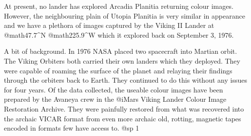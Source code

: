 
At present, no lander has explored Arcadia Planitia returning colour images. However, the neighbouring plain of Utopia Planitia is very similar in appearance and we have a plethora of images captured by the Viking II Lander at @math{47.7^{\circ}}N @math{225.9^{\circ}}W which it explored back on September 3, 1976.

A bit of background. In 1976 NASA placed two spacecraft into Martian orbit. The Viking Orbiters both carried their own landers which they deployed. They were capable of roaming the surface of the planet and relaying their findings through the orbiters back to Earth. They continued to do this without any issues for four years. Of the data collected, the useable colour images have been prepared by the Avaneya crew in the @i{Mars Viking Lander Colour Image Restoration Archive}. They were painfully restored from what was recovered into the archaic VICAR format from even more archaic old, rotting, magnetic tapes encoded in formats few have access to.
@sp 1


